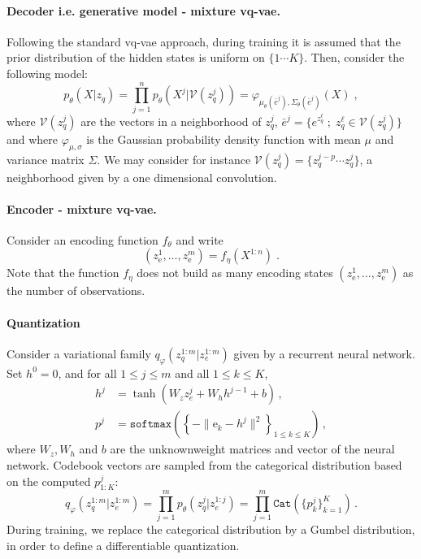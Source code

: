 \documentclass{article}
\newcommand{\eqsp}{\;}
\newcommand{\rme}{\mathrm{e}}
\newcommand{\vois}{\mathcal{V}}
\begin{document}
\paragraph{Decoder i.e. generative model - mixture vq-vae.}
Following the standard vq-vae approach, during training it is assumed that the prior distribution of the hidden states is uniform on $\{1 \cdots K\}$. %
Then, consider the following model:
$$
p_{\theta}(X|z_q) = \prod_{j=1}^n p_{\theta}(X^j|\vois(z_q^j)) = \varphi_{\mu_\theta(\bar e^j),\Sigma_\theta(\bar e^j)}(X)\eqsp,
$$
where $\vois(z_q^j)$ are the vectors in a neighborhood of  $z_q^j$, $\bar e^j = \{e^{z_q^\ell}\;;\; z_q^\ell\in \vois(z_q^j)\}$ and where $\varphi_{\mu,\sigma}$ is the Gaussian probability density function with mean $\mu$ and variance matrix $\Sigma$. We may consider for instance $\vois(z_q^j) = \{z_q^{j-p} \cdots z_q^j\}$, a neighborhood given by a one dimensional convolution.

\paragraph{Encoder - mixture vq-vae.} Consider an encoding function $f_\theta$ and write
$$
(z_\rme^1,\ldots, z_\rme^m) = f_\eta(X^{1:n})\eqsp.
$$
Note that the function $f_\eta$ does not build as many encoding states $(z_\rme^1,\ldots, z_\rme^m)$ as the number of observations.

\paragraph{Quantization} Consider a variational family $q_\varphi(z_q^{1:m}|z_e^{1:m})$ given by a recurrent neural network. Set $h^0 = 0$, and for all $1 \leq j \leq m$ and all $1 \leq k \leq K$,
\begin{align*}
    h^j &= \tanh(W_z z_e^j + W_h h^{j-1} + b)\,, \\
    p^j &= \texttt{softmax}\left(\left\{- \| \rme_k - h^j\|^2\right\}_{1\leqslant k \leqslant K}\right)\,,
\end{align*}
where $W_z, W_h$ and $b$ are the unknownweight matrices and vector of the neural network.
Codebook vectors are sampled  from the categorical distribution based on the computed $p^j_{1:K}$:
$$
q_\varphi(z_q^{1:m} | z_e^{1:m}) = \prod_{j=1}^m p_\theta(z_q^j|z_e^{1:j}) = \prod_{j=1}^m \texttt{Cat}(\{p^j_k\}_{k=1}^K)\,.
$$
During training, we replace the categorical distribution by a Gumbel distribution, in order to define a differentiable quantization.
\end{document}
